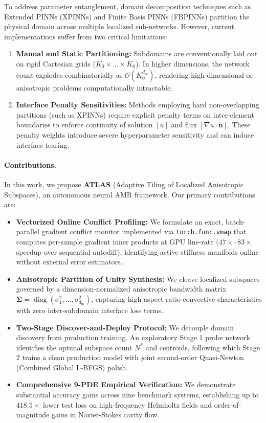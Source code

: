 \documentclass[runningheads]{llncs}
\begin{document}
To address parameter entanglement, domain decomposition techniques such as Extended PINNs (XPINNs) \cite{jagtap2020extended} and Finite Basis PINNs (FBPINNs) \cite{moseley2023finite,dolean2024finite} partition the physical domain across multiple localized sub-networks. However, current implementations suffer from two critical limitations:
\begin{enumerate}
    \item \textbf{Manual and Static Partitioning:} Subdomains are conventionally laid out on rigid Cartesian grids ($K_0 \times \dots \times K_0$). In higher dimensions, the network count explodes combinatorially as $\mathcal{O}(K_0^{d_{\text{in}}})$, rendering high-dimensional or anisotropic problems computationally intractable.
    \item \textbf{Interface Penalty Sensitivities:} Methods employing hard non-overlapping partitions (such as XPINNs) require explicit penalty terms on inter-element boundaries to enforce continuity of solution $[u]$ and flux $[\nabla u \cdot \mathbf{n}]$. These penalty weights introduce severe hyperparameter sensitivity and can induce interface tearing.
\end{enumerate}

\paragraph{Contributions.} In this work, we propose \textbf{ATLAS} (Adaptive Tiling of Localized Anisotropic Subspaces), an autonomous neural AMR framework. Our primary contributions are:
\begin{itemize}
    \item \textbf{Vectorized Online Conflict Profiling:} We formulate an exact, batch-parallel gradient conflict monitor implemented via \texttt{torch.\allowbreak func.\allowbreak vmap} that computes per-sample gradient inner products at GPU line-rate ($47\times\text{--}83\times$ speedup over sequential autodiff), identifying active stiffness manifolds online without external error estimators.
    \item \textbf{Anisotropic Partition of Unity Synthesis:} We cleave localized subspaces governed by a dimension-normalized anisotropic bandwidth matrix $\boldsymbol{\Sigma} = \operatorname{diag}(\sigma_1^2, \dots, \sigma_{d_{\text{in}}}^2)$, capturing high-aspect-ratio convective characteristics with zero inter-subdomain interface loss terms.
    \item \textbf{Two-Stage Discover-and-Deploy Protocol:} We decouple domain discovery from production training. An exploratory Stage 1 probe network identifies the optimal subspace count $N^*$ and centroids, following which Stage 2 trains a clean production model with joint second-order Quasi-Newton (Combined Global L-BFGS) polish.
    \item \textbf{Comprehensive 9-PDE Empirical Verification:} We demonstrate substantial accuracy gains across nine benchmark systems, establishing up to $418.5\times$ lower test loss on high-frequency Helmholtz fields and order-of-magnitude gains in Navier-Stokes cavity flow.
\end{itemize}
\end{document}
